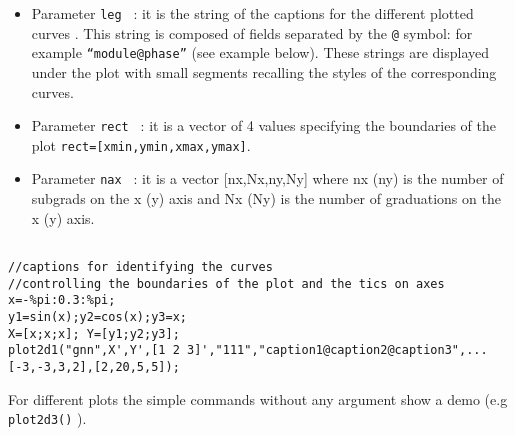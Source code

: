 \begin{itemize}
	    {\tt y=1} : the argument {\tt rect} is used to specify the 
		boundaries of the plot.\\  
		{\tt rect=[xmin,ymin,xmax,ymax]}

	    {\tt y=2}	: the boundaries of the	plot are computed 

	    {\tt y=0}	: the current boundaries 

	    {\tt z=1}	: an axis is drawn and  the number of tics can be specified by the {\tt nax} argument

	    {\tt z=2}	: the plot is only surrounded by a box

\item Parameter {\tt leg } 	 : it is the string of the captions for the different 
plotted curves . This string is composed of fields separated by the {\tt @} 
symbol: for example  {\tt ``module@phase''} (see example below). These 
strings are
displayed under the plot with  small segments recalling the styles of the 
corresponding curves.

\item Parameter {\tt rect } 	: it is a vector of 4 values specifying the boundaries 
of the plot {\tt rect=[xmin,ymin,xmax,ymax]}.

\item Parameter {\tt nax }  	: it is a vector [nx,Nx,ny,Ny] where nx (ny) is 
the number of subgrads on the x (y) axis and Nx (Ny) is the number of 
graduations  on the x (y) axis.

\end{itemize}

\begin{verbatim}

//captions for identifying the curves
//controlling the boundaries of the plot and the tics on axes
x=-%pi:0.3:%pi;
y1=sin(x);y2=cos(x);y3=x;
X=[x;x;x]; Y=[y1;y2;y3];
plot2d1("gnn",X',Y',[1 2 3]',"111","caption1@caption2@caption3",...
[-3,-3,3,2],[2,20,5,5]);

\end{verbatim}



For different plots the simple commands without any argument show a demo 
(e.g {\tt plot2d3()} ).

